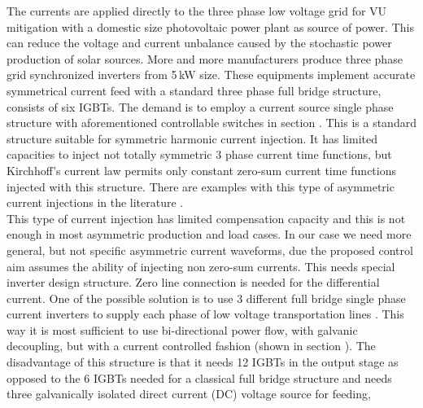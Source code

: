      The currents are applied directly to the three phase low voltage grid for VU mitigation with a domestic size photovoltaic power plant  as source of power. This can reduce the voltage and current unbalance caused by the stochastic power production of solar sources. More and more manufacturers produce three phase grid synchronized inverters from 5\,kW size. These equipments implement accurate symmetrical current feed with a standard three phase full bridge structure, consists of six IGBTs. The demand is to employ a current source single phase structure with aforementioned controllable switches in section . This is a standard structure suitable for symmetric harmonic current injection. It has limited capacities to inject not totally symmetric 3 phase current time functions, but Kirchhoff's current law permits only constant zero-sum current time functions injected with this structure. There are examples with this type of asymmetric current injections in the literature \cite{lee2009new}.\\
    This type of current injection has limited compensation capacity and this is not enough in most asymmetric production and load cases. In our case we need more general, but not specific  asymmetric current waveforms, due the proposed control aim assumes the ability of injecting non zero-sum currents. This needs special inverter design structure. Zero line connection is needed for the differential current. One of the possible solution is to use 3 different full bridge single phase current inverters to supply each phase of low voltage transportation lines \cite{Patnaik2013topologies}. This way it is most sufficient to use bi-directional power flow, with galvanic decoupling, but with a current controlled fashion (shown in section ).  The disadvantage of this structure is that it needs 12 IGBTs in the output stage as opposed to the 6 IGBTs needed for a classical full bridge structure and needs three galvanically isolated direct current (DC) voltage source for feeding, \\
